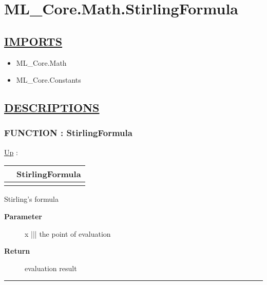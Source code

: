 \chapter*{ML\_Core.Math.StirlingFormula}
\hypertarget{ecldoc:toc:ML_Core.Math.StirlingFormula}{}

\section*{\underline{IMPORTS}}
\begin{itemize}
\item ML\_Core.Math
\item ML\_Core.Constants
\end{itemize}

\section*{\underline{DESCRIPTIONS}}
\subsection*{FUNCTION : StirlingFormula}
\hypertarget{ecldoc:ml_core.math.stirlingformula}{}
\hyperlink{ecldoc:toc:ML_Core/Math}{Up} :

{\renewcommand{\arraystretch}{1.5}
\begin{tabularx}{\textwidth}{|>{\raggedright\arraybackslash}l|X|}
\hline
\hspace{0pt} & StirlingFormula \\
\hline
\multicolumn{2}{|>{\raggedright\arraybackslash}X|}{\hspace{0pt}(REAL x)} \\
\hline
\end{tabularx}
}

\par
Stirling's formula

\par
\begin{description}
\item [\textbf{Parameter}] x ||| the point of evaluation
\item [\textbf{Return}] evaluation result
\end{description}

\rule{\linewidth}{0.5pt}
